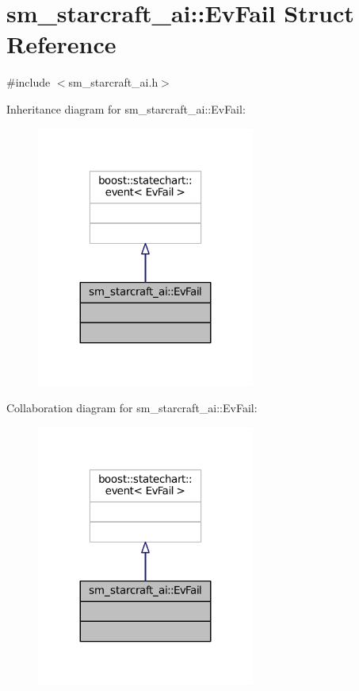 \hypertarget{structsm__starcraft__ai_1_1EvFail}{}\section{sm\+\_\+starcraft\+\_\+ai\+:\+:Ev\+Fail Struct Reference}
\label{structsm__starcraft__ai_1_1EvFail}


{\ttfamily \#include $<$sm\+\_\+starcraft\+\_\+ai.\+h$>$}



Inheritance diagram for sm\+\_\+starcraft\+\_\+ai\+:\+:Ev\+Fail\+:
\nopagebreak
\begin{figure}[H]
\begin{center}
\leavevmode
\includegraphics[width=203pt]{structsm__starcraft__ai_1_1EvFail__inherit__graph}
\end{center}
\end{figure}


Collaboration diagram for sm\+\_\+starcraft\+\_\+ai\+:\+:Ev\+Fail\+:
\nopagebreak
\begin{figure}[H]
\begin{center}
\leavevmode
\includegraphics[width=203pt]{structsm__starcraft__ai_1_1EvFail__coll__graph}
\end{center}
\end{figure}


